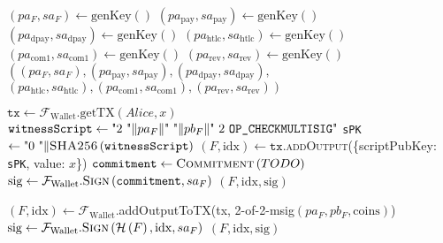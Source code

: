 \begin{algorithmic}[1]
    \State
      \State $\left(pa_F, sa_F\right) \gets \mathrm{genKey}\left(\right)$
      \State $\left(pa_{\mathrm{pay}}, sa_{\mathrm{pay}}\right) \gets
      \mathrm{genKey}\left(\right)$ 
      \State $\left(pa_{\mathrm{dpay}}, sa_{\mathrm{dpay}}\right) \gets
      \mathrm{genKey}\left(\right)$ 
      \State $\left(pa_{\mathrm{htlc}}, sa_{\mathrm{htlc}}\right) \gets
      \mathrm{genKey}\left(\right)$ 
      \State $\left(pa_{\mathrm{com}1}, sa_{\mathrm{com}1}\right) \gets
      \mathrm{genKey}\left(\right)$ 
      \State $\left(pa_{\mathrm{rev}}, sa_{\mathrm{rev}}\right) \gets
      \mathrm{genKey}\left(\right)$ 
      \State \Return $\left(\left(pa_F, sa_F\right), \left(pa_{\mathrm{pay}},
      sa_{\mathrm{pay}}\right), \left(pa_{\mathrm{dpay}},
      sa_{\mathrm{dpay}}\right),\right.$
      \Indent
        \State $\left.\left(pa_{\mathrm{htlc}}, sa_{\mathrm{htlc}}\right),
        \left(pa_{\mathrm{com}1}, sa_{\mathrm{com}1}\right),
        \left(pa_{\mathrm{rev}}, sa_{\mathrm{rev}}\right)\right)$
      \EndIndent
    \EndFunction
    \State

     
      \State $\mathtt{tx} \gets
      \mathcal{F}_{\mathrm{Wallet}}.\mathrm{getTX}\left(Alice, x\right)$
      \State $\mathtt{witnessScript} \gets \text{"2 "} \Vert pa_F \Vert \text{"
      "} \Vert pb_F \Vert \text{" 2 \texttt{OP\_CHECKMULTISIG}"}$
      \State \texttt{sPK} $\gets \text{"0 "} \Vert
      \textsc{SHA256}\left(\mathtt{witnessScript}\right)$
      \State $\left(F, \mathrm{idx}\right) \gets
      \mathtt{tx}$.\textsc{addOutput}(\{scriptPubKey: \texttt{sPK}, value:
      $x$\})
      \State $\mathtt{commitment} \gets \textsc{Commitment}\left(TODO\right)$
      \State $\mathrm{sig} \gets
      \mathcal{F}_{\mathrm{Wallet}}.\textsc{Sign}\left(\mathtt{commitment},
      sa_F\right)$ 
      \State \Return $\left(F, \mathrm{idx}, \mathrm{sig}\right)$
    \EndFunction
    \State

      \State $\left(F, \mathrm{idx}\right) \gets
      \mathcal{F}_{\mathrm{Wallet}}$.addOutputToTX(tx, 2-of-2-msig$\left(pa_F,
      pb_F, \mathrm{coins}\right)$)
      \State $\mathrm{sig} \gets
      \mathcal{F}_{\mathrm{Wallet}}.\textsc{Sign}\left(\mathcal{H}\left(F\right),
      \mathrm{idx}, sa_F\right)$
      \State \Return $\left(F, \mathrm{idx}, \mathrm{sig}\right)$
    \EndFunction
    \State


\end{algorithmic}
